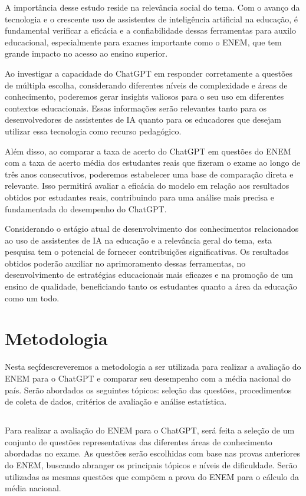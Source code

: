 \documentclass[12pt, a4paper]{article}
\begin{document}
\begin{itemize}
A importância desse estudo reside na relevância social do tema. Com o avanço da tecnologia e o crescente uso de assistentes de inteligência artificial na educação, é fundamental verificar a eficácia e a confiabilidade dessas ferramentas para auxilo educacional, especialmente para exames importante como o ENEM, que tem grande impacto no acesso ao ensino superior.

Ao investigar a capacidade do ChatGPT em responder corretamente a questões de múltipla escolha, considerando diferentes níveis de complexidade e áreas de conhecimento, poderemos gerar insights valiosos para o seu uso em diferentes contextos educacionais. Essas informações serão relevantes tanto para os desenvolvedores de assistentes de IA quanto para os educadores que desejam utilizar essa tecnologia como recurso pedagógico.

Além disso, ao comparar a taxa de acerto do ChatGPT em questões do ENEM com a taxa de acerto média dos estudantes reais que fizeram o exame ao longo de três anos consecutivos, poderemos estabelecer uma base de comparação direta e relevante. Isso permitirá avaliar a eficácia do modelo em relação aos resultados obtidos por estudantes reais, contribuindo para uma análise mais precisa e fundamentada do desempenho do ChatGPT.

Considerando o estágio atual de desenvolvimento dos conhecimentos relacionados ao uso de assistentes de IA na educação e a relevância geral do tema, esta pesquisa tem o potencial de fornecer contribuições significativas. Os resultados obtidos poderão auxiliar no aprimoramento dessas ferramentas, no desenvolvimento de estratégias educacionais mais eficazes e na promoção de um ensino de qualidade, beneficiando tanto os estudantes quanto a área da educação como um todo.
\end{itemize}

\section{Metodologia}
Nesta seçfdescreveremos a metodologia a ser utilizada para realizar a avaliação do ENEM para o ChatGPT e comparar seu desempenho com a média nacional do país. Serão abordados os seguintes tópicos: seleção das questões, procedimentos de coleta de dados, critérios de avaliação e análise estatística.
\subsection{}
Para realizar a avaliação do ENEM para o ChatGPT, será feita a seleção de um conjunto de questões representativas das diferentes áreas de conhecimento abordadas no exame. As questões serão escolhidas com base nas provas anteriores do ENEM, buscando abranger os principais tópicos e níveis de dificuldade. Serão utilizadas as mesmas questões que compõem a prova do ENEM para o cálculo da média nacional.
\end{document}
